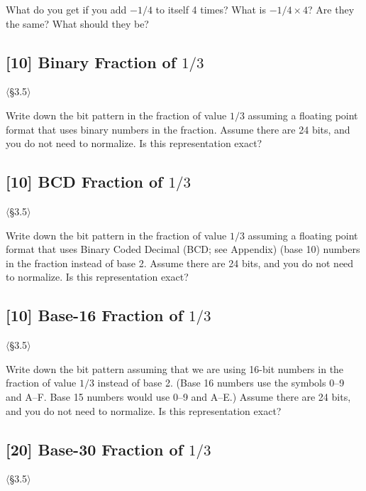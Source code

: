 \noindent What do you get if you add $-1/4$ to itself 4 times? What is
$-1/4 \times 4$? Are they the same? What should they be?

\problembreak

\subsection{[10] Binary Fraction of $1/3$}
\hypertarget{prob-3.43}{}
\noindent$\langle$\S3.5$\rangle$\medskip

\noindent Write down the bit pattern in the fraction of value $1/3$ assuming a
floating point format that uses binary numbers in the fraction. Assume there
are 24 bits, and you do not need to normalize. Is this representation exact?

\problembreak

\subsection{[10] BCD Fraction of $1/3$}
\hypertarget{prob-3.44}{}
\noindent$\langle$\S3.5$\rangle$\medskip

\noindent Write down the bit pattern in the fraction of value $1/3$ assuming a
floating point format that uses Binary Coded Decimal (BCD; see Appendix)
(base 10) numbers in the fraction instead of base 2. Assume there are 24
bits, and you do not need to normalize. Is this representation exact?

\problembreak

\subsection{[10] Base-16 Fraction of $1/3$}
\hypertarget{prob-3.45}{}
\noindent$\langle$\S3.5$\rangle$\medskip

\noindent Write down the bit pattern assuming that we are using 16-bit numbers
in the fraction of value $1/3$ instead of base 2. (Base 16 numbers use the
symbols 0--9 and A--F. Base 15 numbers would use 0--9 and A--E.) Assume there
are 24 bits, and you do not need to normalize. Is this representation exact?

\problembreak

\subsection{[20] Base-30 Fraction of $1/3$}
\hypertarget{prob-3.46}{}
\noindent$\langle$\S3.5$\rangle$\medskip

